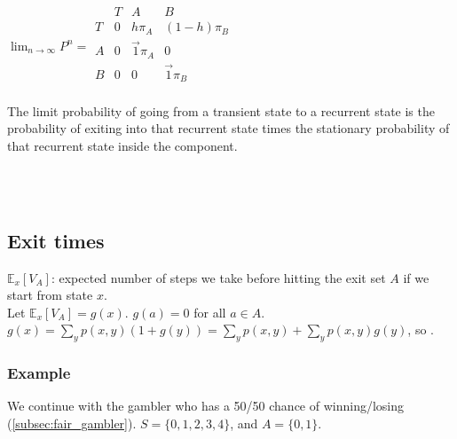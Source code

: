 \documentclass{article}
\begin{document}
\begin{minipage}[t]{0.5\textwidth}
\setlength{\arraycolsep}{10pt}
\renewcommand{\arraystretch}{1.4}
$\lim_{n \to \infty} P^n = \begin{array}{c|c|c|c}
& T & A & B \\
\hline
T & 0 & h \pi_A & (1-h) \pi_B\\
\hline
A & 0 & \vec{1} \pi_A & 0 \\
\hline
B & 0 & 0 & \vec{1} \pi_B \\
\end{array}$
\end{minipage}
\begin{minipage}[t]{0.5\textwidth}
The limit probability of going from a transient state to a recurrent state is the probability of exiting into that recurrent state times the stationary probability of that recurrent state inside the component.
\end{minipage} \\ \\


\subsection{Exit times}
$\mathbb{E}_x[V_A]$: expected number of steps we take before hitting the exit set $A$ if we start from state $x$. \\

Let $\mathbb{E}_x[V_A] = g(x)$. $g(a) = 0$ for all $a \in A$. \\

$g(x) = \sum_y p(x, y) (1 + g(y)) = \sum_y p(x, y) + \sum_y p(x, y) g(y)$, so .


\subsubsection{Example}
We continue with the gambler who has a 50/50 chance of winning/losing (\ref{subsec:fair_gambler}). $S = \{0, 1, 2, 3, 4\}$, and $A = \{0, 1\}$.
\end{document}
